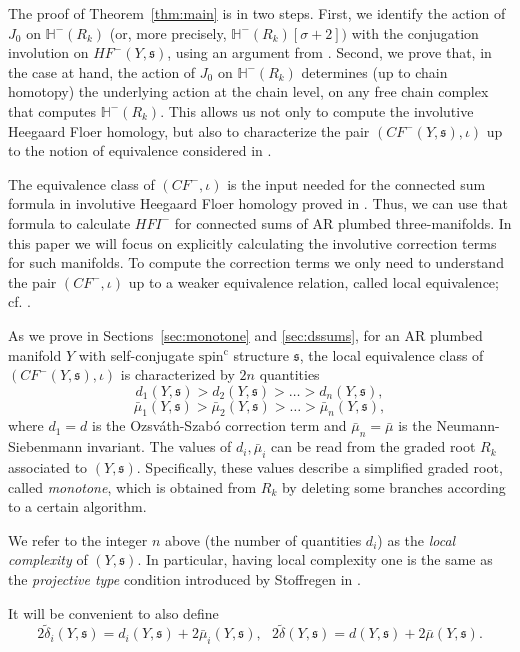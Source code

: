 \documentclass[11 pt]{amsart}
\theoremstyle{remark}
\def\spinc {{\operatorname{spin^c}}}
\def\s{\mathfrak s}
\def\He{\mathbb{H}}
\def\CF {\mathit{CF}}
\def\HF {\mathit{HF}}
\newcommand \CFm {\CF^-}
\newcommand \HFm {\HF^-}
\def\HFI {\mathit{HFI}}
\newcommand \HFIm {\HFI^-}
\def\inv{\iota}
\def\tdelta{\tilde\delta}
\begin{document}
The proof of Theorem~\ref{thm:main} is in two steps. First, we identify the action of $J_0$ on $\He^-(R_k)$ (or, more precisely, $\He^-(R_k)[\sigma+2])$ with the conjugation involution on $\HFm(Y, \s)$, using an argument from \cite{Dai}. Second, we prove that, in the case at hand, the action of $J_0$ on $\He^-(R_k)$ determines (up to chain homotopy) the underlying action at the chain level, on any free chain complex that computes $\He^-(R_k)$. This allows us not only to compute the involutive Heegaard Floer homology, but also to characterize the pair $(\CFm(Y, \s), \inv)$ up to the notion of equivalence considered in \cite[Definition 8.3]{HMZ}. 

The equivalence class of $(\CFm, \inv)$ is the input needed for the connected sum formula in involutive Heegaard Floer homology proved in \cite{HMZ}. Thus, we can use that formula to calculate $\HFIm$ for connected sums of AR plumbed three-manifolds. In this paper we will focus on explicitly calculating the involutive correction terms for such manifolds. To compute the correction terms we only need to understand the pair $(\CFm, \inv)$ up to a weaker equivalence relation, called local equivalence; cf. \cite[Definition 8.5]{HMZ}. 

As we prove in Sections~\ref{sec:monotone} and \ref{sec:dssums}, for an AR plumbed manifold $Y$ with self-conjugate $\spinc$ structure $\s$, the local equivalence class of $(\CFm(Y, \s), \inv)$ is characterized by $2n$ quantities 
$$ d_1(Y, \s) > d_2(Y, \s) > \dots > d_n(Y, \s), $$
$$ \bar \mu_1(Y, \s) > \bar \mu_2(Y, \s) > \dots > \bar \mu_n(Y, \s),$$
where $d_1=d$ is the Ozsv\'ath-Szab\'o correction term and $\bar \mu_n = \bar \mu$ is the Neumann-Siebenmann invariant. The values of $d_i, \bar \mu_i$ can be read from the graded root $R_k$ associated to $(Y, \s)$. Specifically, these values describe a simplified graded root, called {\em monotone}, which is obtained from $R_k$ by deleting some branches according to a certain algorithm. 

We refer to the integer $n$ above (the number of quantities $d_i$) as the {\em local complexity} of $(Y, \s)$. In particular, having local complexity one is the same as the {\em projective type} condition introduced by Stoffregen in \cite[Section 5.2]{Stoffregen}.

It will be convenient to also define
\[
2\tdelta_i(Y, \s) = d_i(Y, \s) + 2\bar \mu_i(Y, \s), \ \ \ 2\tdelta(Y, \s) = d(Y, \s) + 2\bar \mu(Y, \s).
\]
\end{document}
